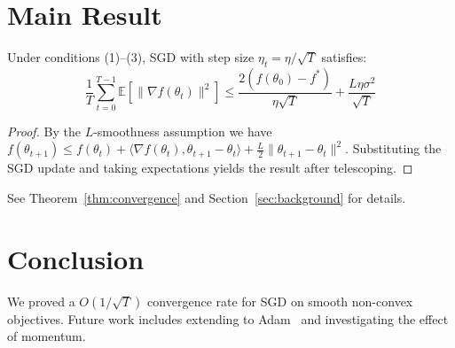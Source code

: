 \documentclass{article}
\begin{document}
\section{Main Result}
\label{sec:main}

\begin{theorem}
\label{thm:convergence}
Under conditions (1)--(3), SGD with step size $\eta_t = \eta / \sqrt{T}$ satisfies:
\[
\frac{1}{T} \sum_{t=0}^{T-1} \mathbb{E}[\|\nabla f(\theta_t)\|^2]
\leq \frac{2(f(\theta_0) - f^*)}{\eta \sqrt{T}} + \frac{L \eta \sigma^2}{\sqrt{T}}
\]
\end{theorem}

\begin{proof}
By the $L$-smoothness assumption we have $f(\theta_{t+1}) \leq f(\theta_t)
+ \langle \nabla f(\theta_t), \theta_{t+1} - \theta_t \rangle
+ \frac{L}{2}\|\theta_{t+1} - \theta_t\|^2$.  Substituting the SGD update
and taking expectations yields the result after telescoping.
\end{proof}

See Theorem~\ref{thm:convergence} and Section~\ref{sec:background} for details.

\section{Conclusion}

We proved a $O(1/\sqrt{T})$ convergence rate for SGD on smooth non-convex
objectives.  Future work includes extending to Adam~\cite{kingma2014adam}
and investigating the effect of momentum.



\end{document}

